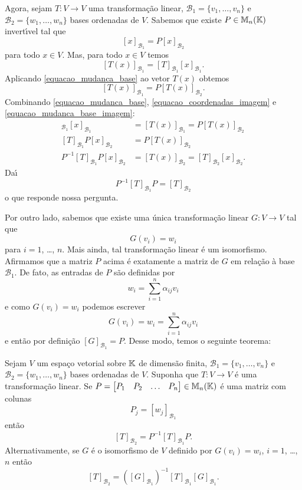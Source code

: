 Agora, sejam $T : V \to V$ uma transforma\c{c}\~ao linear, $\mathcal{B}_1 = \{v_1,\dots,v_n\}$ e $\mathcal{B}_2 = \{w_1,\dots,w_n\}$ bases ordenadas de $V$. Sabemos que existe $P \in \mathbb{M}_n(\mathbb{K})$ invert{\'\i}vel tal que
\begin{equation}\label{equacao_mudanca_base}
  [x]_{\mathcal{B}_1} = P[x]_{\mathcal{B}_2}
\end{equation}
para todo $x \in V$. Mas, para todo $x \in V$ temos
\begin{equation}\label{equacao_coordenadas_imagem}
  [T(x)]_{\mathcal{B}_1} = [T]_{\mathcal{B}_1}[x]_{\mathcal{B}_1}.
\end{equation}
Aplicando \eqref{equacao_mudanca_base} ao vetor $T(x)$ obtemos
\begin{equation}\label{equacao_mudanca_base_imagem}
  [T(x)]_{\mathcal{B}_1} = P[T(x)]_{\mathcal{B}_2}.
\end{equation}
Combinando \eqref{equacao_mudanca_base}, \eqref{equacao_coordenadas_imagem} e \eqref{equacao_mudanca_base_imagem}:
\begin{align*}
  [T]_{\mathcal{B}_1}[x]_{\mathcal{B}_1} &= [T(x)]_{\mathcal{B}_1} = P[T(x)]_{\mathcal{B}_2}\\
  [T]_{\mathcal{B}_1}P[x]_{\mathcal{B}_2} &= P[T(x)]_{\mathcal{B}_2}\\
  P^{-1}[T]_{\mathcal{B}_1}P[x]_{\mathcal{B}_2} &= [T(x)]_{\mathcal{B}_2} = [T]_{\mathcal{B}_2}[x]_{\mathcal{B}_2}.
\end{align*}
Da{\'\i}
\[
  P^{-1}[T]_{\mathcal{B}_1}P = [T]_{\mathcal{B}_2}
\]
o que responde nossa pergunta.

Por outro lado, sabemos que existe uma \'unica transforma\c{c}\~ao linear $G : V \to V$ tal que
\[
  G(v_i) = w_i
\]
para $i = 1$, \dots, $n$. Mais ainda, tal transforma\c{c}\~ao linear \'e um isomorfismo. Afirmamos que a matriz $P$ acima \'e exatamente a matriz de $G$ em rela\c{c}\~ao \`a base $\mathcal{B}_1$. De fato, as entradas de $P$ s\~ao definidas por
\[
  w_i = \sum_{i=1}^n\alpha_{ij}v_i
\]
e como $G(v_i) = w_i$ podemos escrever
\[
  G(v_i) = w_i = \sum_{i=1}^n\alpha_{ij}v_i
\]
e ent\~ao por defini\c{c}\~ao $[G]_{\mathcal{B}_1} = P$. Desse modo, temos o seguinte teorema:

\begin{teorema}
  Sejam $V$ um espa\c{c}o vetorial sobre $\mathbb{K}$ de dimens\~ao finita, $\mathcal{B}_1 = \{v_1,\dots,v_n\}$ e $\mathcal{B}_2 = \{w_1,\dots,w_n\}$ bases ordenadas de $V$. Suponha que $T : V \to V$ \'e uma transforma\c{c}\~ao linear. Se $P = \begin{bmatrix}P_1 & P_2 & \dots & P_n
  \end{bmatrix} \in \mathbb{M}_n(\mathbb{K})$ \'e uma matriz com colunas
  \[
    P_j = [w_j]_{\mathcal{B}_1}
  \]
  ent\~ao
  \[
    [T]_{\mathcal{B}_2} = P^{-1}[T]_{\mathcal{B}_1}P.
  \]
  Alternativamente, se $G$ \'e o isomorfismo de $V$ definido por $G(v_i) = w_i$, $i = 1$, \dots, $n$ ent\~ao
  \[
    [T]_{\mathcal{B}_2} = ([G]_{\mathcal{B}_1})^{-1}[T]_{\mathcal{B}_1}[G]_{\mathcal{B}_1}.
  \]
\end{teorema}

